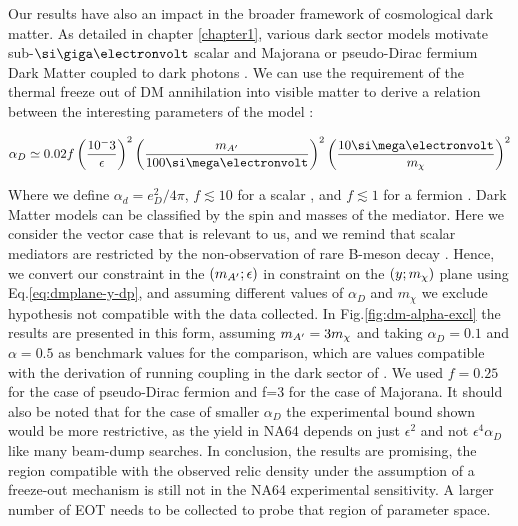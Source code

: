 Our results have also an impact in the broader framework of cosmological dark matter. As detailed in chapter \ref{chapter1}, various dark sector models motivate sub-$\gev$ scalar and Majorana or pseudo-Dirac fermium Dark Matter coupled to dark photons \cite{battaglieri2017cosmic}. We can use the requirement of the thermal freeze out of DM annihilation into visible matter to derive a relation between the interesting parameters of the model \cite{na64-prd}:

\begin{equation}
  \label{eq:ad-freeze-out}
  \alpha_D \simeq 0.02 f\left(\frac{10^-3}{\epsilon}\right)^2\left(\frac{m_{\DM}}{100 \mev}\right)^2\left(\frac{10 \mev}{m_{\chi}}\right)^2
\end{equation}

Where we define $\alpha_d = e^2_D/4\pi$, $f\lesssim 10$ for a scalar \cite{deNiverville:2011it}, and $f\lesssim 1$ for a fermion \cite{PhysRevD.91.094026}. Dark Matter models can be classified by the spin and masses of the mediator. Here we consider the vector case that is relevant to us, and we remind that scalar mediators are restricted by the non-observation of rare B-meson decay \cite{battaglieri2017cosmic}. Hence, we convert our constraint in the $(m_{A'};\epsilon)$ in constraint on the $(y;m_{\chi})$ plane using Eq.\ref{eq:dmplane-y-dp}, and assuming different values of $\alpha_D$ and $m_{\chi}$ we exclude hypothesis not compatible with the data collected. In Fig.\ref{fig:dm-alpha-excl} the results are presented in this form, assuming $m_{A'} = 3m_{\chi}$ and taking $\alpha_D=0.1$ and $\alpha=0.5$ as benchmark values for the comparison, which are values compatible with the derivation of running coupling in the dark sector of \cite{Davoudiasl:2015hxa}. We used $f=0.25$ for the case of pseudo-Dirac fermion and f=3 for the case of Majorana. It should also be noted that for the case of smaller $\alpha_D$ the experimental bound shown would be more restrictive, as the yield in NA64 depends on just $\epsilon^2$ and not $\epsilon^4 \alpha_D$ like many beam-dump searches. In conclusion, the results are promising, the region compatible with the observed relic density under the assumption of a freeze-out mechanism is still not in the NA64 experimental sensitivity. A larger number of EOT needs to be collected to probe that region of parameter space.

